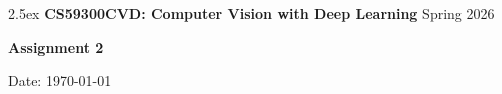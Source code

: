\documentclass[oneside,11pt,letter]{article}
\newcommand{\myname}{}
\newcommand{\report}{}
\begin{document}

\thispagestyle{empty}
\begin{mdframed}
\baselineskip2.5ex
{\bf CS59300CVD: Computer Vision with Deep Learning}
\hfill
Spring 2026

{\Large
\begin{center}
{\bf \sf Assignment 2}
\end{center}
}

{\bf \myname}
\hfill
Date: \today
\end{mdframed}

\report{}

\end{document}
